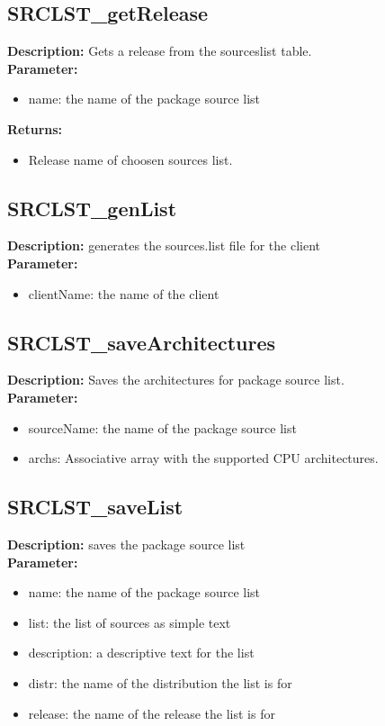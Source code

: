 \subsection{SRCLST\_getRelease}
\textbf{Description:} Gets a release from the sourceslist table.\\
\textbf{Parameter:}
\begin{itemize}
\item name: the name of the package source list
\end{itemize}
\textbf{Returns:}
\begin{itemize}
\item Release name of choosen sources list.
\end{itemize}

\subsection{SRCLST\_genList}
\textbf{Description:} generates the sources.list file for the client\\
\textbf{Parameter:}
\begin{itemize}
\item clientName: the name of the client
\end{itemize}

\subsection{SRCLST\_saveArchitectures}
\textbf{Description:} Saves the architectures for package source list.\\
\textbf{Parameter:}
\begin{itemize}
\item sourceName: the name of the package source list
\item archs: Associative array with the supported CPU architectures.
\end{itemize}

\subsection{SRCLST\_saveList}
\textbf{Description:} saves the package source list\\
\textbf{Parameter:}
\begin{itemize}
\item name: the name of the package source list
\item list: the list of sources as simple text
\item description: a descriptive text for the list
\item distr: the name of the distribution the list is for
\item release: the name of the release the list is for
\end{itemize}

